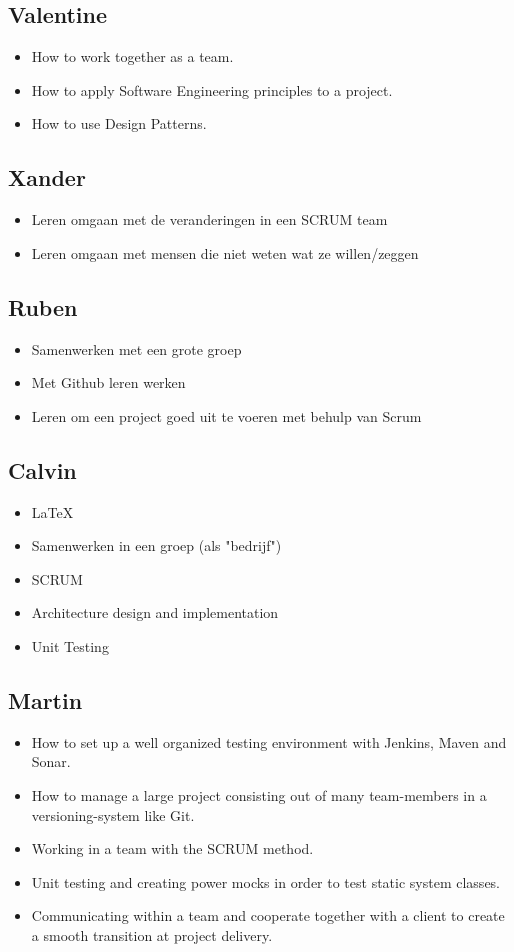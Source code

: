 \documentclass{article}
\begin{document}
\subsection*{Valentine}
\begin{itemize}
	\item How to work together as a team.
	\item How to apply Software Engineering principles to a project.
	\item How to use Design Patterns.
\end{itemize}

\subsection*{Xander}
\begin{itemize}
	\item Leren omgaan met de veranderingen in een SCRUM team
	\item Leren omgaan met mensen die niet weten wat ze willen/zeggen
\end{itemize}

\subsection*{Ruben}
\begin{itemize}
	\item Samenwerken met een grote groep
	\item Met Github leren werken
	\item Leren om een project goed uit te voeren met behulp van Scrum
\end{itemize}
\subsection*{Calvin}
\begin{itemize}
 	\item \LaTeX
	\item Samenwerken in een groep (als "bedrijf")
	\item SCRUM
	\item Architecture design and  implementation
	\item Unit Testing
\end{itemize}
\subsection*{Martin}
\begin{itemize}
  \item How to set up a well organized testing environment with Jenkins, Maven and Sonar.
  \item How to manage a large project consisting out of many team-members in a versioning-system like Git.
  \item Working in a team with the SCRUM method.
  \item Unit testing and creating power mocks in order to test static system classes.
  \item Communicating within a team and cooperate together with a client to create a smooth transition at project delivery.
\end{itemize}
\end{document}

